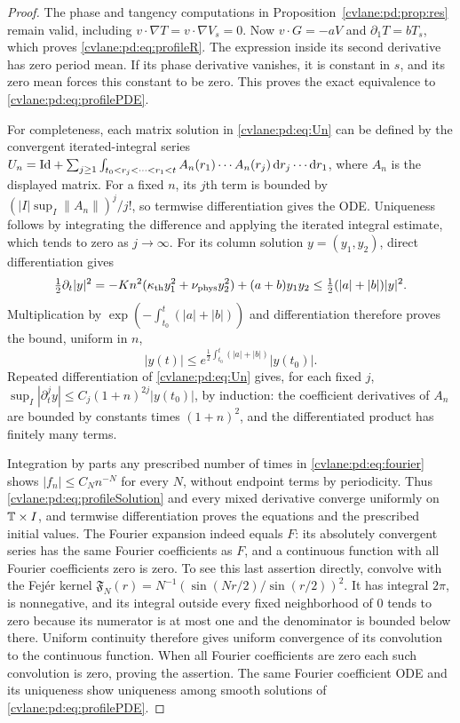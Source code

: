 \begin{proof}
The phase and tangency computations in Proposition~\ref{cvlane:pd:prop:res} remain
valid, including $v\cdot\nabla T=v\cdot\nabla V_s=0$.
Now $v\cdot G=-aV$ and $\partial_1T=bT_s$, which proves
\eqref{cvlane:pd:eq:profileR}. The expression inside its second derivative has zero
period mean. If its phase derivative vanishes, it is constant in $s$,
and its zero mean forces this constant to be zero. This proves the exact
equivalence to \eqref{cvlane:pd:eq:profilePDE}.

For completeness, each matrix solution in \eqref{cvlane:pd:eq:Un} can be defined by
the convergent iterated-integral series
$U_n=\mathrm{Id}+\sum_{j\geq1}\int_{t_0<r_j<\cdots<r_1<t}
 A_n(r_1)\cdots A_n(r_j)\,\mathrm d r_j\cdots\mathrm d r_1$, where $A_n$ is the
displayed matrix. For a fixed $n$, its $j$th term is bounded by
$(|I|\sup_I\|A_n\|)^j/j!$, so termwise differentiation gives the ODE.
Uniqueness follows by integrating the difference and applying the
iterated integral estimate, which tends to zero as $j\to\infty$.
For its column solution $y=(y_1,y_2)$, direct differentiation gives
\[
 \tfrac12\partial_t|y|^2
 =-Kn^2(\kappa_{\rm th} y_1^2+\nu_{\rm phys} y_2^2)+(a+b)y_1y_2
 \leq \tfrac12(|a|+|b|)|y|^2.
\]
Multiplication by $\exp(-\int_{t_0}^t(|a|+|b|))$ and differentiation
therefore proves the bound, uniform in $n$,
\[
 |y(t)|\leq e^{\frac12\int_{t_0}^t(|a|+|b|)}|y(t_0)|.
\]
Repeated differentiation of \eqref{cvlane:pd:eq:Un} gives, for each fixed $j$,
$\sup_I|\partial_t^j y|\leq C_j(1+n)^{2j}|y(t_0)|$, by induction:
the coefficient derivatives of $A_n$ are bounded by constants times
$(1+n)^2$, and the differentiated product has finitely many terms.

Integration by parts any prescribed number of times in \eqref{cvlane:pd:eq:fourier}
shows $|f_n|\leq C_N n^{-N}$ for every $N$, without endpoint terms by
periodicity. Thus \eqref{cvlane:pd:eq:profileSolution} and every mixed derivative
converge uniformly on $\mathbb T\times I$, and termwise differentiation proves
the equations and the prescribed initial values. The Fourier expansion
indeed equals $F$: its absolutely convergent series has the same Fourier
coefficients as $F$, and a continuous function with all Fourier
coefficients zero is zero. To see this last assertion directly, convolve
with the Fej\'er kernel
$\mathfrak F_N(r)=N^{-1}(\sin(Nr/2)/\sin(r/2))^2$.
It has integral $2\pi$, is nonnegative, and its integral outside every
fixed neighborhood of $0$ tends to zero because its numerator is at
most one and the denominator is bounded below there. Uniform continuity
therefore gives uniform convergence of its convolution to the continuous
function. When all Fourier coefficients are zero each such convolution
is zero, proving the assertion. The same Fourier coefficient ODE and
its uniqueness show uniqueness among smooth solutions of
\eqref{cvlane:pd:eq:profilePDE}.
\end{proof}

